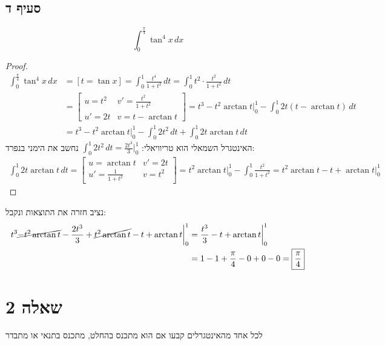 \documentclass{article}
\begin{document}
	\pagebreak
	\subsection*{סעיף ד}
	\[
		\int_0^{\frac{\pi}{4}}	\tan^4 x \, dx
	\]
	\begin{proof}
		\begin{align*}
			\int_0^{\frac{\pi}{4}}	\tan^4 x \, dx
			&= [t = \tan x]
			= \int_0^1 \frac{t^4}{1+t^2} \, dt
			= \int_0^1 t^2 \cdot \frac{t^2}{1+t^2} \, dt \\
			&= \begin{bmatrix}
				u = t^2 & v' = \frac{t^2}{1+t^2} \\
				u' = 2t & v = t - \arctan t
			\end{bmatrix}
			= t^3 - t^2 \arctan t \biggr|_0^1
			- \int_0^1 2t(t - \arctan t) \, dt \\
			&= t^3 - t^2 \arctan t \biggr|_0^1
			- \int_0^1 2t^2 \, dt + \int_0^1 2t\arctan t \, dt
		\end{align*}
		האינטגרל השמאלי הוא טריוויאלי: $\int_0^1 2t^2 \, dt = \frac{2t^3}{3} \biggr|_0^1$
		נחשב את הימני בנפרד:
		\begin{align*}
			\int_0^1 2t\arctan t \, dt
			= \begin{bmatrix}
				u = \arctan t & v' = 2t \\
				u' = \frac{1}{1+t^2} & v = t^2
			\end{bmatrix}
			= t^2 \arctan t \biggr|_0^1
			- \int_0^1 \frac{t^2}{1+t^2}
			= t^2 \arctan t - t + \arctan t \biggr|_0^1
		\end{align*}
	\end{proof}
	נציב חזרה את התוצאות ונקבל:
	\begin{align*}
		t^3 \cancel{- t^2 \arctan t} - \frac{2t^3}{3} + \cancel{t^2 \arctan t} - t + \arctan t \biggr|_0^1
		&= \frac{t^3}{3} - t + \arctan t \biggr|_0^1 \\
		&= 1 - 1 + \frac{\pi}{4} - 0 + 0 - 0
		= \boxed{\frac{\pi}{4}}
	\end{align*}


	\pagebreak
	\section*{שאלה 2}
	לכל אחד מהאינטגרלים קבעו אם הוא מתכנס בהחלט, מתכנס בתנאי או מתבדר
\end{document}
